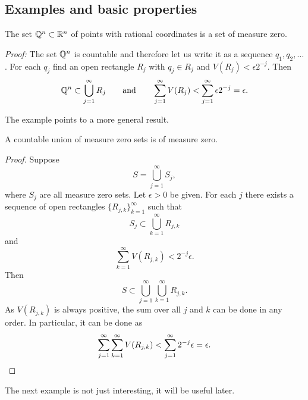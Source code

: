 \subsection{Examples and basic properties}

\begin{example}
The set ${\mathbb{Q}}^n \subset {\mathbb{R}}^n$ of points with rational coordinates
is a set of measure zero.

\emph{Proof:}
The set ${\mathbb{Q}}^n$ is countable and therefore let us write it
as a sequence $q_1,q_2,\ldots$.  For each $q_j$ find an open rectangle
$R_j$ with $q_j \in R_j$ and $V(R_j) < \epsilon 2^{-j}$.  Then
\begin{equation*}
{\mathbb{Q}}^n \subset \bigcup_{j=1}^\infty R_j \qquad \text{and} \qquad
\sum_{j=1}^\infty V(R_j) <
\sum_{j=1}^\infty \epsilon 2^{-j} = \epsilon .
\end{equation*}
\end{example}

The example points to a more general result.

\begin{prop}
A countable union of measure zero sets is of measure zero.
\end{prop}

\begin{proof}
Suppose
\begin{equation*}
S = \bigcup_{j=1}^\infty S_j ,
\end{equation*}
where $S_j$ are all measure zero sets.  Let $\epsilon > 0$ be given.
For each $j$
there exists a sequence of open rectangles $\{ R_{j,k} \}_{k=1}^\infty$
such that
\begin{equation*}
S_j \subset \bigcup_{k=1}^\infty R_{j,k}
\end{equation*}
and 
\begin{equation*}
\sum_{k=1}^\infty V(R_{j,k}) < 2^{-j} \epsilon .
\end{equation*}
Then
\begin{equation*}
S \subset \bigcup_{j=1}^\infty \bigcup_{k=1}^\infty R_{j,k} .
\end{equation*}
As $V(R_{j,k})$ is always positive, the sum over all $j$ and $k$
can be done in any order.  In particular, it can be done as
\begin{equation*}
\sum_{j=1}^\infty \sum_{k=1}^\infty V(R_{j,k}) <
\sum_{j=1}^\infty 2^{-j} \epsilon = \epsilon . \qedhere
\end{equation*}
\end{proof}

The next example is not just interesting, it will be useful later.

